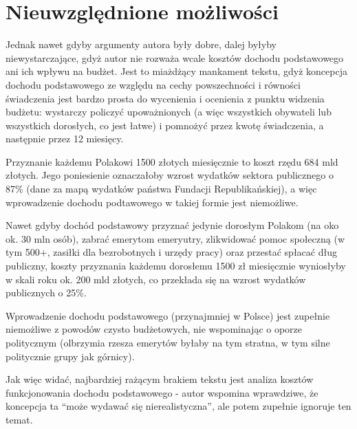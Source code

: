\documentclass[11pt]{article}
\begin{document}
	\section{Nieuwzględnione możliwości}
		\par Jednak nawet gdyby argumenty autora były dobre, dalej byłyby niewystarczające, gdyż autor nie rozważa wcale kosztów dochodu podstawowego ani ich wpływu na budżet. Jest to miażdżący mankament tekstu, gdyż koncepcja dochodu podstawowego ze względu na cechy powszechności i równości świadczenia jest bardzo prosta do wycenienia i ocenienia z punktu widzenia budżetu: wystarczy policzyć upoważnionych (a więc wszystkich obywateli lub wszystkich dorosłych, co jest łatwe) i pomnożyć przez kwotę świadczenia, a następnie przez 12 miesięcy.
		\par Przyznanie każdemu Polakowi 1500 złotych miesięcznie to koszt rzędu 684 mld złotych. Jego poniesienie oznaczałoby wzrost wydatków sektora publicznego o 87\% (dane za mapą wydatków państwa Fundacji Republikańskiej), a więc wprowadzenie dochodu podtawowego w takiej formie jest niemożliwe.
		\par Nawet gdyby dochód podstawowy przyznać jedynie dorosłym Polakom (na oko ok. 30 mln osób), zabrać emerytom emeryutry, zlikwidować pomoc społeczną (w tym 500+, zasiłki dla bezrobotnych i urzędy pracy) oraz przestać spłacać dług publiczny, koszty przyznania każdemu dorosłemu 1500 zł miesięcznie wyniosłyby w skali roku ok. 200 mld złotych, co przekłada się na wzrost wydatków publicznych o 25\%.
		\par Wprowadzenie dochodu podstawowego (przynajmniej w Polsce) jest zupełnie niemożliwe z powodów czysto budżetowych, nie wspominając o oporze politycznym (olbrzymia rzesza emerytów byłaby na tym stratna, w tym silne politycznie grupy jak górnicy).
		\par Jak więc widać, najbardziej rażącym brakiem tekstu jest analiza kosztów funkcjonowania dochodu podstawowego - autor wspomina wprawdziwe, że koncepcja ta ``może wydawać się nierealistyczna'', ale potem zupełnie ignoruje ten temat.
\end{document}
